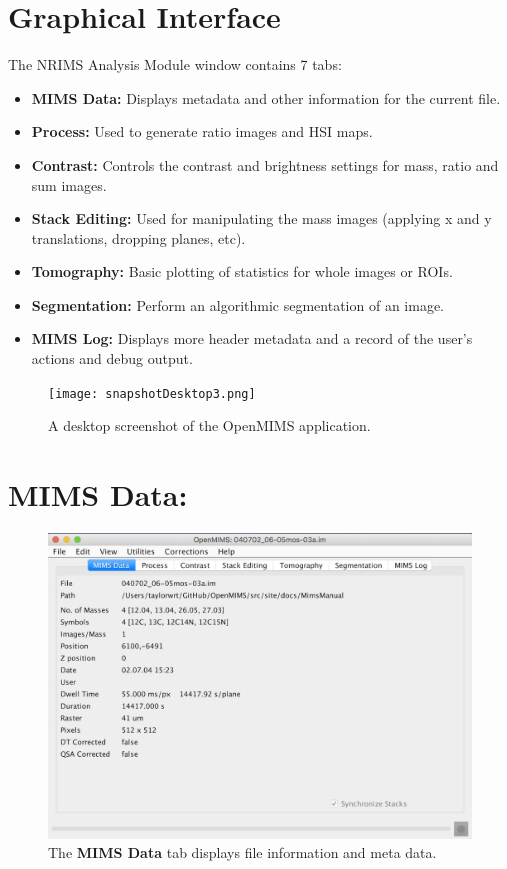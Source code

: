 \documentclass{article}
\begin{document}
\newpage
\section*{Graphical Interface}
	
	The NRIMS Analysis Module window contains 7 tabs:
	\begin{itemize}
	\item \textbf{MIMS Data:} Displays metadata and other information for the current file.
	\item \textbf{Process:} Used to generate ratio images and HSI maps.
	\item \textbf{Contrast:} Controls the contrast and brightness settings for mass, ratio and sum images.
	\item \textbf{Stack Editing:} Used for manipulating the mass images (applying x and y translations, dropping planes, etc).
	\item \textbf{Tomography:} Basic plotting of statistics for whole images or ROIs.
	\item \textbf{Segmentation:} Perform an algorithmic segmentation of an image.
	\item \textbf{MIMS Log:} Displays more header metadata and a record of the user's actions and debug output.
	\end{itemize}
	\vfill
	\begin{figure}[ht]
	\centering
	\texttt{[image: snapshotDesktop3.png]}
	\caption{A desktop screenshot of the OpenMIMS application.}
	\end{figure}


\newpage
\section*{MIMS Data:}
	
	\begin{figure}[ht]
	\centering
	\includegraphics[scale=0.70]{snapshotMIMData.png}
	\caption{The \textbf{MIMS Data} tab displays file information and meta data.}
	\end{figure}
	
\end{document}
